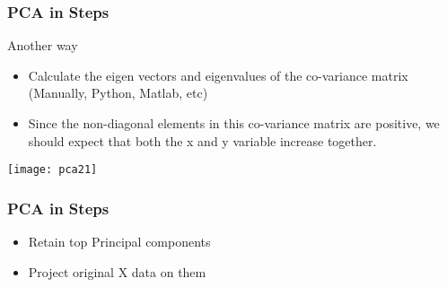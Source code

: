 \begin{frame}[fragile] \frametitle{PCA in Steps} 
Another way
\begin{itemize}
\item Calculate the eigen vectors and eigenvalues of 
the co-variance matrix (Manually, Python, Matlab, etc)
\item Since the non-diagonal elements in this co-variance 
matrix are positive, we should expect that both the x 
and y variable increase together.
\end{itemize}
\begin{center}
\texttt{[image: pca21]}
\end{center}
\end{frame}


\begin{frame}[fragile] \frametitle{PCA in Steps} 
\begin{itemize}
\item Retain top Principal components 
\item Project original X data on them
\end{itemize}
\end{frame}




